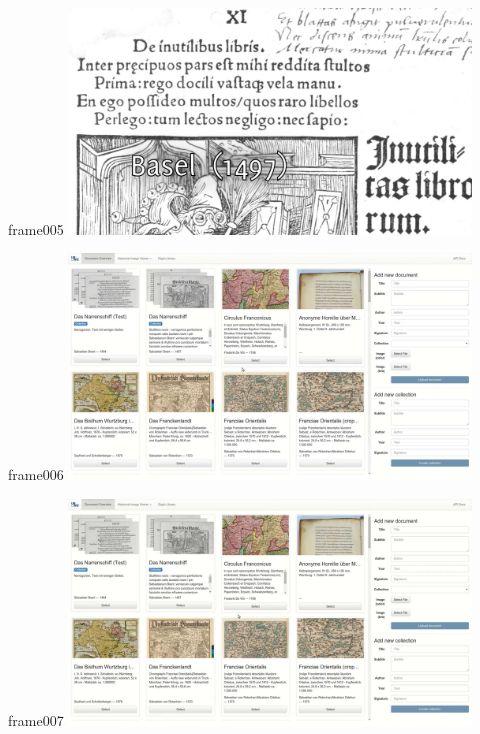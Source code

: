 \documentclass{beamer}
\begin{document}
\begin{frame}{frame005}
\includegraphics[width=0.8\textwidth]{output/exported-frames/frame005.png}
\note{}
\end{frame}

\begin{frame}{frame006}
\includegraphics[width=0.8\textwidth]{output/exported-frames/frame006.png}
\note{}
\end{frame}

\begin{frame}{frame007}
\includegraphics[width=0.8\textwidth]{output/exported-frames/frame007.png}
\note{}
\end{frame}
\end{document}
